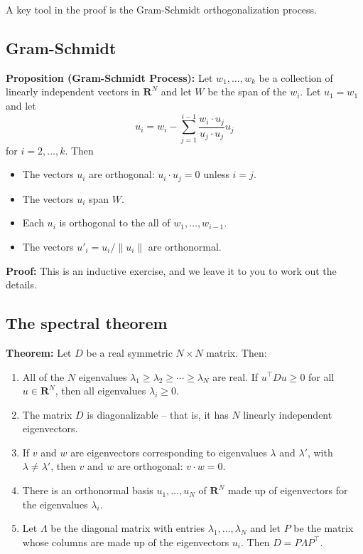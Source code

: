 \documentclass[
  oneside]{scrbook}
\providecommand{\tightlist}{%
  \setlength{\itemsep}{0pt}\setlength{\parskip}{0pt}}
\begin{document}
A key tool in the proof is the Gram-Schmidt orthogonalization process.

\hypertarget{sec:gsprocess}{%
\subsection{Gram-Schmidt}\label{sec:gsprocess}}

\textbf{Proposition (Gram-Schmidt Process):} Let \(w_{1},\ldots, w_{k}\)
be a collection of linearly independent vectors in \(\mathbf{R}^{N}\)
and let \(W\) be the span of the \(w_{i}\). Let \(u_{1} = w_{1}\) and
let \[
u_{i} = w_{i} - \sum_{j=1}^{i-1} \frac{w_{i}\cdot u_{j}}{u_{j}\cdot u_{j}}u_{j}
\] for \(i=2,\ldots, k\). Then

\begin{itemize}
\tightlist
\item
  The vectors \(u_{i}\) are orthogonal: \(u_{i}\cdot u_{j}=0\) unless
  \(i=j\).
\item
  The vectors \(u_{i}\) span \(W\).
\item
  Each \(u_{i}\) is orthogonal to the all of \(w_{1},\ldots, w_{i-1}\).
\item
  The vectors \(u'_{i} = u_{i}/\|u_{i}\|\) are orthonormal.
\end{itemize}

\textbf{Proof:} This is an inductive exercise, and we leave it to you to
work out the details.

\hypertarget{the-spectral-theorem}{%
\subsection{The spectral theorem}\label{the-spectral-theorem}}

\textbf{Theorem:} Let \(D\) be a real symmetric \(N\times N\) matrix.
Then:

\begin{enumerate}
\def\labelenumi{\arabic{enumi}.}
\tightlist
\item
  All of the \(N\) eigenvalues
  \(\lambda_1\ge \lambda_2\ge \cdots \ge \lambda_{N}\) are real. If
  \(u^{\intercal}Du\ge 0\) for all \(u\in\mathbf{R}^{N}\), then all
  eigenvalues \(\lambda_{i}\ge 0\).
\item
  The matrix \(D\) is diagonalizable -- that is, it has \(N\) linearly
  independent eigenvectors.
\item
  If \(v\) and \(w\) are eigenvectors corresponding to eigenvalues
  \(\lambda\) and \(\lambda'\), with \(\lambda\not=\lambda'\), then
  \(v\) and \(w\) are orthogonal: \(v\cdot w=0\).
\item
  There is an orthonormal basis \(u_{1},\ldots, u_{N}\) of
  \(\mathbf{R}^{N}\) made up of eigenvectors for the eigenvalues
  \(\lambda_{i}\).
\item
  Let \(\Lambda\) be the diagonal matrix with entries
  \(\lambda_{1},\ldots, \lambda_{N}\) and let \(P\) be the matrix whose
  columns are made up of the eigenvectors \(u_{i}\). Then
  \(D=P\Lambda P^{\intercal}\).
\end{enumerate}
\end{document}
